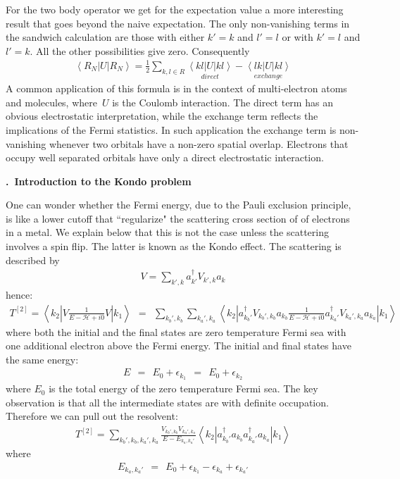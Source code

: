 \documentclass[onecolumn,fleqn, 11pt]{revtex4}
\newcommand{\beq}{\begin{eqnarray}}
\newcommand{\eeq}{\end{eqnarray}}
\renewcommand{\thesubsection}{\arabic{subsection}}
\renewcommand{\thesubsubsection}{\arabic{subsubsection}}
\newcommand{\sheadC}[1]
{
\addtocounter{subsubsection}{1}
\vspace{5mm}
{\bf \thesubsection.\thesubsubsection \ #1}  
\nopagebreak
\phantomsection
}
\begin{document}
For the two body operator we get for the expectation value  
a more interesting result that goes beyond the naive expectation.
The only non-vanishing terms in the sandwich calculation 
are those with either $k'=k$ and $l'=l$ or with $k'=l$ and $l'=k$.  
All the other possibilities give zero. Consequently    
\beq
\left\langle R_N |U| R_N \right\rangle
=\frac{1}{2}
\sum_{k,l \in R} 
\underset{direct}{\left\langle kl|U| kl \right\rangle }
-\underset{exchange}{\left\langle lk|U|kl \right\rangle }
\eeq
A common application of this formula is in 
the context of multi-electron atoms and molecules, 
where~$U$ is the Coulomb interaction. 
The direct term has an obvious electrostatic 
interpretation, while the exchange term reflects 
the implications of the Fermi statistics.      
In such application the exchange term is non-vanishing 
whenever two orbitals have a non-zero spatial overlap. 
Electrons that occupy well separated orbitals 
have only a direct electrostatic interaction.   



\sheadC{Introduction to the Kondo problem}

One can wonder whether the Fermi energy, due to the Pauli  
exclusion principle, is like a lower cutoff that ``regularize" 
the scattering cross section of of electrons in a metal. 
We explain below that this is not the case unless the scattering 
involves a spin flip. The latter is known as the Kondo effect.    
The scattering is described by 
\beq
V = \sum_{k',k} a^{\dag}_{k'} V_{k',k} a_{k}
\eeq
hence:
\beq
T^{[2]} = 
\left\langle k_{2} \left| 
V \frac{1}{E-\mathcal{H}+i0} V 
\right|k_{1} \right\rangle
\ \ = \ \ 
\sum_{k_b',k_b}
\sum_{k_a',k_a}
\left\langle k_{2} \left| 
a^{\dag}_{k_b'} V_{k_b',k_b} a_{k_b}
\frac{1}{E-\mathcal{H}+i0}
a^{\dag}_{k_a'} V_{k_a',k_a} a_{k_a}
\right|k_{1}\right\rangle
\eeq
where both the initial and the final 
states are zero temperature Fermi sea 
with one additional electron above 
the Fermi energy. The initial and final 
states have the same energy:  
\beq
E \ \ = \ \  E_0 + \epsilon_{k_1} \ \ = \ \ E_0 + \epsilon_{k_2}
\eeq
where $E_0$ is the total energy of 
the zero temperature Fermi sea.
The key observation is that 
all the intermediate states are 
with definite occupation. 
Therefore we can pull out the resolvent:
\beq
T^{[2]}
=  \sum_{k_b',k_b,k_a',k_a}
\frac{V_{k_b',k_b} V_{k_a',k_a}}{E-E_{k_a,k_a'}}
\left\langle k_{2} \left| 
a^{\dag}_{k_b'}  a_{k_b}
a^{\dag}_{k_a'}  a_{k_a}
\right|k_{1}\right\rangle
\eeq
where 
\beq
E_{k_a,k_a'}\ \ = \ \ E_0 + \epsilon_{k_1} - \epsilon_{k_a} + \epsilon_{k_a'}
\eeq
\end{document}
